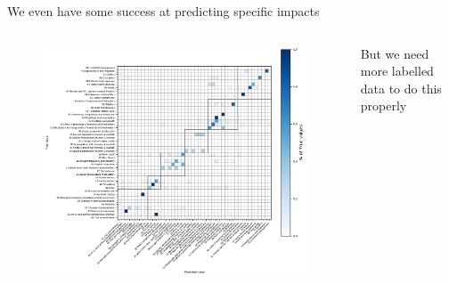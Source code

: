 \documentclass[9pt]{beamer}
\begin{document}
\begin{frame}{We even have some success at predicting specific impacts}



\begin{columns}
	\begin{column}{0.8\linewidth}
		\begin{figure}
			\includegraphics[width=\linewidth]{../plots/prediction_models/confusion_all_classes_recall.pdf}
		\end{figure}
	\end{column}
	\begin{column}{0.2\linewidth}
		But we need more labelled data to do this properly
	\end{column}
\end{columns}


\end{frame}
\end{document}
